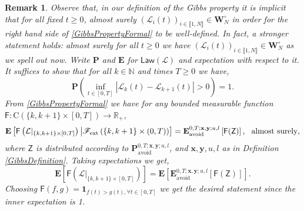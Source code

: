 \documentclass[]{article}
\newtheorem{rmk}[thm]{Remark}
\begin{document}
\begin{rmk}\label{RmkNonIntersectionGibbs}
Observe that, in our definition of the Gibbs property it is implicit that for all fixed $t\ge 0$, almost surely $(\mathcal{L}_i(t))_{i\in \llbracket 1,N \rrbracket }\in \mathbf{W}_N^\circ$ in order for the right hand side of \eqref{GibbsPropertyFormal} to be well-defined. In fact, a stronger statement holds: almost surely for all $t\ge 0$ we have $(\mathcal{L}_i(t))_{i\in \llbracket 1,N \rrbracket }\in \mathbf{W}_N^\circ$ as we spell out now. Write $\mathbf{P}$ and $\mathbf{E}$ for $\mathsf{Law}(\mathcal{L})$ and expectation with respect to it. It suffices to show that for all $k \in \mathbb{N}$ and times $T\ge 0$ we have,
\begin{equation*}
\mathbf{P}\left(\inf_{t\in [0,T]}\left|\mathcal{L}_k(t)-\mathcal{L}_{k+1}(t)\right|>0\right)=1.
\end{equation*}
From \eqref{GibbsPropertyFormal} we have for any bounded measurable function $\mathsf{F}:\mathrm{C}(\{k,k+1\}\times[0,T])\to \mathbb{R}_+$,
\begin{equation*}
\mathbf{E}\left[\mathsf{F}\left(\mathcal{L}|_{\{k,k+1\}\times[0,T]}\right)\big|\mathscr{F}_{\mathrm{ext}}\left(\{k,k+1\} \times (0,T) \right)\right]=\mathbf{E}_{\mathrm{avoid}}^{0,T;\mathbf{x},\mathbf{y};u,l}\left[\mathsf{F}(\mathsf{Z})\right], \ \textnormal{ almost surely},
\end{equation*}
where $\mathsf{Z}$ is distributed according to $\mathbf{P}_{\mathrm{avoid}}^{0,T;\mathbf{x},\mathbf{y};u,l}$, and $\mathbf{x},\mathbf{y},u,l$ as in Definition \ref{GibbsDefinition}. Taking expectations we get,
\begin{equation*}
\mathbf{E}\left[\mathsf{F}\left(\mathcal{L}|_{\{k,k+1\}\times[0,T]}\right)\right]=\mathbf{E}\left[\mathbf{E}_{\mathrm{avoid}}^{0,T;\mathbf{x},\mathbf{y};u,l}\left[\mathsf{F}(\mathsf{Z})\right]\right].
\end{equation*}
 Choosing $\mathsf{F}(f,g)=\mathbf{1}_{f(t)>g(t), \forall t \in [0,T]}$ we get the desired statement since the inner expectation is 1.
\end{rmk}
\end{document}
